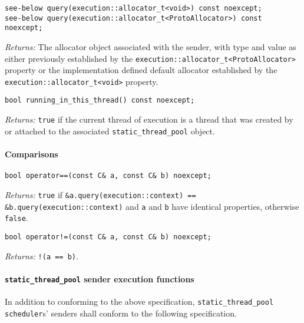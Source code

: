 \documentclass[a4paper,12pt,notitlepage,twoside,openright]{article}
\begin{document}
\begin{verbatim}
see-below query(execution::allocator_t<void>) const noexcept;
see-below query(execution::allocator_t<ProtoAllocator>) const noexcept;
\end{verbatim}

\emph{Returns:} The allocator object associated with the sender, with
type and value as either previously established by the
\texttt{execution::allocator_t<ProtoAllocator>} property or
the implementation defined default allocator established by the
\texttt{execution::allocator_t<void>} property.

\begin{verbatim}
bool running_in_this_thread() const noexcept;
\end{verbatim}

\emph{Returns:} \texttt{true} if the current thread of
execution is a thread that was created by or attached to the associated
\texttt{static_thread_pool} object.

\hypertarget{comparisons-1}{%
\paragraph{Comparisons}\label{comparisons-1}}

\begin{verbatim}
bool operator==(const C& a, const C& b) noexcept;
\end{verbatim}

\emph{Returns:} \texttt{true} if
\texttt{&a.query(execution::context) == &b.query(execution::context)}
and \texttt{a} and \texttt{b} have identical
properties, otherwise \texttt{false}.

\begin{verbatim}
bool operator!=(const C& a, const C& b) noexcept;
\end{verbatim}

\emph{Returns:} \texttt{!(a == b)}.

\hypertarget{static_thread_pool-sender-execution-functions}{%
\paragraph{\texorpdfstring{\texttt{static_thread_pool}
sender execution
functions}{ sender execution functions}}\label{static_thread_pool-sender-execution-functions}}

In addition to conforming to the above specification,
\texttt{static_thread_pool} \texttt{scheduler}s'
senders shall conform to the following specification.
\end{document}
